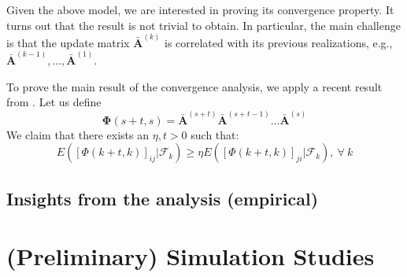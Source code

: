 \documentclass[letter]{article}
\newtheorem{prop}{Proposition}
\theoremstyle{remark}
\begin{document}
Given the above model, we are interested in proving its convergence property. It turns out that the result is not trivial to obtain. In particular, the main challenge is that the update matrix $\bar{\bm A}^{(k)}$ is correlated with its previous realizations, e.g., $\bar{\bm A}^{(k-1)}, ..., \bar{\bm A}^{(1)}$. 

To prove the main result of the convergence analysis, we apply a recent result from \cite{}. Let us define 
\[
\bm{\Phi} (s+t,s) = \bar{\bm A}^{(s+t)}  \bar{\bm A}^{(s+t-1)} \ldots  \bar{\bm A}^{(s)}
\]
We claim that there exists an $\eta, t > 0$ such that:
\[
E \left( [\Phi (k+t,k)]_{ij} | \mathcal{F}_{k} \right) \geq \eta E \left( [\Phi (k+t,k)]_{ji} | \mathcal{F}_{k} \right),~\forall~k
\]


\subsection{Insights from the analysis (empirical)}

\section{(Preliminary) Simulation Studies}
\end{document}
